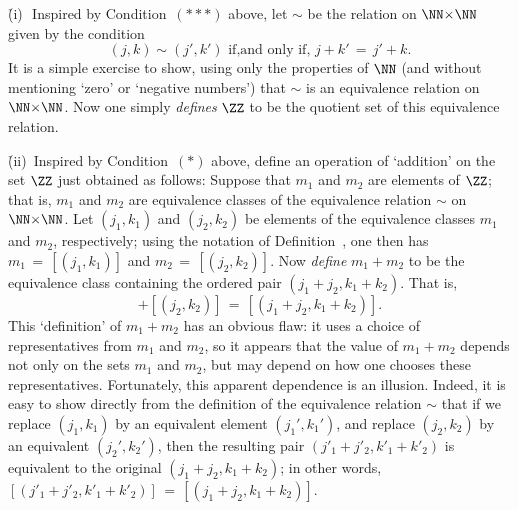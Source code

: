 {{{        \h (i)\,\, Inspired by Condition~$({\ast}{\ast}{\ast})$ above, let ${\sim}$ be the relation on ${\NN}{\times}{\NN}$ given by the condition
        \begin{displaymath}
        (j,k) {\sim} (j',k') \mbox{ if,and only if, } j+k' \,=\, j'+k.
        \end{displaymath}
    It is a simple exercise to show, using only the properties of ${\NN}$ (and without mentioning `zero' or `negative numbers') that ${\sim}$ is an equivalence relation on ${\NN}{\times}{\NN}$.
    Now one simply {\em defines} ${\ZZ}$ to be the quotient set of this equivalence relation.

        \h (ii)\, Inspired by Condition~$({\ast})$ above, define an operation of `addition' on the set ${\ZZ}$ just obtained as follows:
    Suppose that $m_{1}$ and $m_{2}$ are elements of ${\ZZ}$; that is, $m_{1}$ and $m_{2}$ are equivalence classes of the equivalence relation $\sim$ on ${\NN}{\times}{\NN}$.
    Let $(j_{1},k_{1})$ and $(j_{2},k_{2})$ be elements of the equivalence classes $m_{1}$ and $m_{2}$, respectively;
    using the notation of Definition~, one then has $m_{1} \,=\, [(j_{1},k_{1})]$ and $m_{2} \,=\, [(j_{2},k_{2})]$.
    Now {\em define} $m_{1}+m_{2}$ to be the equivalence class containing the ordered pair $(j_{1}+j_{2},k_{1}+k_{2})$.
    That is,
        \begin{displaymath}
        [(j_{1},k_{1})] + [(j_{2},k_{2})] \,=\, [(j_{1}+j_{2},k_{1}+k_{2})].
        \end{displaymath}
        This `definition' of $m_{1}+m_{2}$ has an obvious flaw: it uses a choice of representatives from $m_{1}$ and $m_{2}$,
    so it appears that the value of $m_{1}+m_{2}$ depends not only on the sets $m_{1}$ and $m_{2}$, but may depend on how one chooses these representatives.
    Fortunately, this apparent dependence is an illusion.
    Indeed, it is easy to show directly from the definition of the equivalence relation ${\sim}$ that if we replace $(j_{1},k_{1})$ by an equivalent element $(j_{1}',k_{1}')$,
    and replace $(j_{2},k_{2})$ by an equivalent $(j_{2}',k_{2}')$, then the resulting pair $(j'_{1}+j'_{2},k'_{1}+k'_{2})$ is equivalent to the original $(j_{1}+j_{2},k_{1}+k_{2})$;
    in other words, $[(j'_{1}+j'_{2},k'_{1}+k'_{2})] \,=\, [(j_{1}+j_{2},k_{1}+k_{2})]$.


}}}
